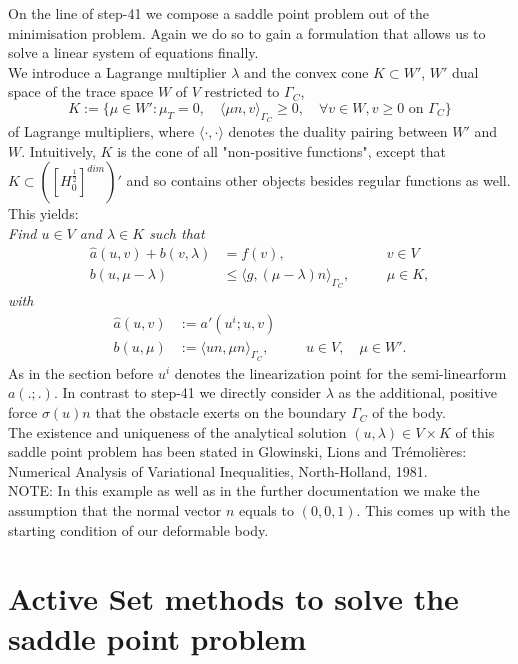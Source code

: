 \documentclass{article}
\begin{document}
On the line of step-41 we compose a saddle point problem out of the minimisation problem. Again we do so to gain a formulation
that allows us to solve a linear system of equations finally.\\
We introduce a Lagrange multiplier $\lambda$ and the convex cone $K\subset W'$,
$W'$ dual space of the trace space $W$ of $V$ restricted to $\Gamma_C$,
$$K:=\{\mu\in W':\mu_T = 0,\quad\langle\mu n,v\rangle_{\Gamma_C}\geq 0,\quad
\forall v\in W, v \ge 0\text{ on }\Gamma_C \}$$
of Lagrange multipliers, where $\langle\cdot,\cdot\rangle$
denotes the duality pairing between $W'$ and $W$. Intuitively, $K$ is the cone
of all "non-positive functions", except that $ K\subset
\left( \left[ H_0^{\frac{1}{2}} \right]^{dim} \right)' $ and so contains other
objects besides regular functions as well. This yields:\\

\noindent
\textit{Find $u\in V$ and $\lambda\in K$ such that}
\begin{align*}
 \hat{a}(u,v) + b(v,\lambda) &= f(v),\quad &&v\in V\\
 b(u,\mu - \lambda) &\leq \langle g,(\mu -
 \lambda)n\rangle_{\Gamma_C},\quad&&\mu\in K,
\end{align*}
\textit{with}
\begin{align*}
 \hat{a}(u,v) &:= a'(u^i;u,v)\\
 b(u,\mu) &:= \langle un,\mu n\rangle_{\Gamma_C},\quad &&u\in V,\quad\mu\in W'.
\end{align*}
As in the section before $u^i$ denotes the linearization point for the
semi-linearform $a(.;.)$. In contrast to step-41 we directly consider $\lambda$
as the additional, positive force $\sigma(u)n$ that the obstacle
exerts on the boundary $\Gamma_C$ of the body.\\

\noindent
The existence and uniqueness of the analytical solution $(u,\lambda)\in V\times
K$ of this saddle point problem has been stated in Glowinski, Lions and Tr\'{e}moli\`{e}res: Numerical
Analysis of Variational Inequalities, North-Holland, 1981.\\

\noindent
NOTE: In this example as well as in the further documentation we make the
assumption that the normal vector $n$ equals to $(0,0,1)$. This comes up with
the starting condition of our deformable body.

\section{Active Set methods to solve the saddle point problem}
\end{document}
